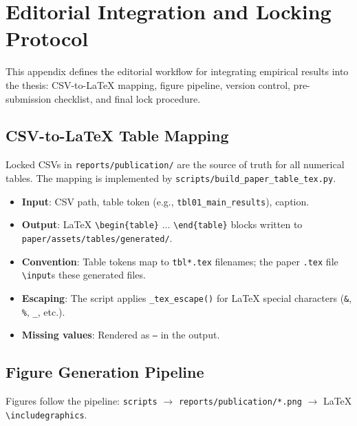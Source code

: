 \chapter{Editorial Integration and Locking Protocol}
\label{app:editorial-integration-locking}

This appendix defines the editorial workflow for integrating empirical results into the thesis: CSV-to-LaTeX mapping, figure pipeline, version control, pre-submission checklist, and final lock procedure.

\section{CSV-to-LaTeX Table Mapping}
\label{sec:csv-to-latex}

Locked CSVs in \texttt{reports/publication/} are the source of truth for all numerical tables. The mapping is implemented by \texttt{scripts/build\_paper\_table\_tex.py}.

\begin{itemize}
\item \textbf{Input}: CSV path, table token (e.g., \texttt{tbl01\_main\_results}), caption.
\item \textbf{Output}: LaTeX \texttt{\textbackslash begin\{table\}} ... \texttt{\textbackslash end\{table\}} blocks written to \texttt{paper/assets/tables/generated/}.
\item \textbf{Convention}: Table tokens map to \texttt{tbl*.tex} filenames; the paper \texttt{.tex} file \texttt{\textbackslash input}s these generated files.
\item \textbf{Escaping}: The script applies \texttt{\_tex\_escape()} for LaTeX special characters (\texttt{\&}, \texttt{\%}, \texttt{\_}, etc.).
\item \textbf{Missing values}: Rendered as \texttt{---} in the output.
\end{itemize}

\section{Figure Generation Pipeline}
\label{sec:figure-pipeline}

Figures follow the pipeline: \texttt{scripts} $\rightarrow$ \texttt{reports/publication/*.png} $\rightarrow$ LaTeX \texttt{\textbackslash includegraphics}.

